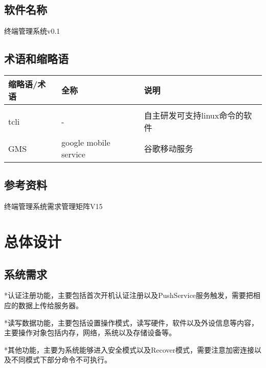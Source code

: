 \documentclass[UTF8]{ctexart}
\newcommand{\note}[1]{\textcolor{blue}{\emph{[#1]}}}   %
\begin{document}
    \subsection{软件名称}
    \par{终端管理系统v0.1}
    \subsection{术语和缩略语} 
      \begin{tabular}{p{70pt} p{80pt} p{120pt} }
       \hline
       \hline
       缩略语/术语 & 全称 & 说明\\  %
       \hline
       \\
       tcli & - & 自主研发可支持linux命令的软件\\
       \hline
       GMS & google mobile service & 谷歌移动服务
       \\
       \hline
       \hline
     \end{tabular}
    \subsection{参考资料} 
	 \par{终端管理系统需求管理矩阵V15}
	 
    \newpage
    \section{总体设计}  %
    \subsection{系统需求}
    \par{*认证注册功能，主要包括首次开机认证注册以及PushService服务触发，需要把相应的数据上传给服务器。}
    \par{*读写数据功能，主要包括设置操作模式，读写硬件，软件以及外设信息等内容，主要操作对象包括内存，网络，系统以及存储设备等。}
    \par{*其他功能，主要为系统能够进入安全模式以及Recover模式，需要注意加密连接以及不同模式下部分命令不可执行。}
    
\end{document}

